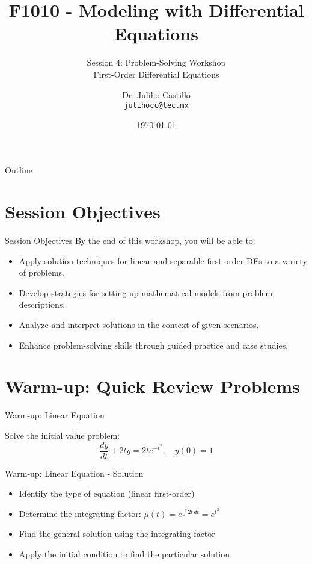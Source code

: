 \documentclass[10pt,aspectratio=169]{beamer}
\title{F1010 - Modeling with Differential Equations}
\subtitle{Session 4: Problem-Solving Workshop \\ First-Order Differential Equations}
\author{Dr. Juliho Castillo \\ \texttt{julihocc@tec.mx}}
\institute{Tec de Monterrey}
\date{\today}
\newcommand{\formula}[1]{\textit{#1}}
\newcounter{problemcounter}
\begin{document}
\setcounter{problemcounter}{0}

\maketitle

\begin{frame}{Outline}
    \tableofcontents
\end{frame}

\section{Session Objectives}
\begin{frame}{Session Objectives}
    By the end of this workshop, you will be able to:
    \begin{itemize}
        \item Apply solution techniques for linear and separable first-order DEs to a variety of problems.
        \item Develop strategies for setting up mathematical models from problem descriptions.
        \item Analyze and interpret solutions in the context of given scenarios.
        \item Enhance problem-solving skills through guided practice and case studies.
    \end{itemize}
\end{frame}

\section{Warm-up: Quick Review Problems}
\begin{frame}{Warm-up: Linear Equation}
    \begin{problembox}
        Solve the initial value problem:
        \formula{\[ \frac{dy}{dt} + 2ty = 2te^{-t^2}, \quad y(0) = 1 \]}
    \end{problembox}
\end{frame}

\begin{frame}{Warm-up: Linear Equation - Solution}
    \begin{solutionbox}
        \begin{itemize}
            \item Identify the type of equation (linear first-order)
            \item Determine the integrating factor: $\mu(t) = e^{\int 2t \, dt} = e^{t^2}$
            \item Find the general solution using the integrating factor
            \item Apply the initial condition to find the particular solution
        \end{itemize}
    \end{solutionbox}
\end{frame}
\end{document}
